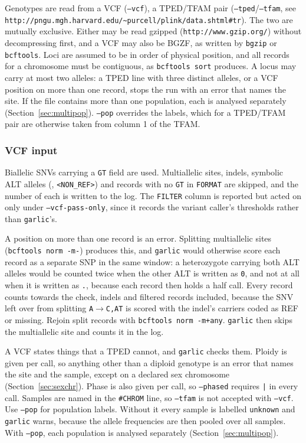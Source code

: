 \documentclass[12pt]{article}%
\begin{document}
Genotypes are read from a VCF ({\tt --vcf}), a TPED/TFAM pair ({\tt --tped}/{\tt --tfam}, see \\{\tt http://pngu.mgh.harvard.edu/\textasciitilde purcell/plink/data.shtml\#tr}).  The two are mutually exclusive.  Either may be read gzipped ({\tt http://www.gzip.org/}) without decompressing first, and a VCF may also be BGZF, as written by {\tt bgzip} or {\tt bcftools}.  Loci are assumed to be in order of physical position, and all records for a chromosome must be contiguous, as {\tt bcftools sort} produces.  A locus may carry at most two alleles: a TPED line with three distinct alleles, or a VCF position on more than one record, stops the run with an error that names the site.  If the file contains more than one population, each is analysed separately (Section~\ref{sec:multipop}).  {\tt --pop} overrides the labels, which for a TPED/TFAM pair are otherwise taken from column 1 of the TFAM.

\subsubsection{VCF input}
\label{sec:vcf}

Biallelic SNVs carrying a {\tt GT} field are used.  Multiallelic sites, indels, symbolic ALT alleles ({\tt *}, {\tt <NON\_REF>}) and records with no {\tt GT} in {\tt FORMAT} are skipped, and the number of each is written to the log.  The {\tt FILTER} column is reported but acted on only under {\tt --vcf-pass-only}, since it records the variant caller's thresholds rather than {\tt garlic}'s.

A position on more than one record is an error.  Splitting multiallelic sites ({\tt bcftools norm -m-}) produces this, and {\tt garlic} would otherwise score each record as a separate SNP in the same window: a heterozygote carrying both ALT alleles would be counted twice when the other ALT is written as {\tt 0}, and not at all when it is written as {\tt .}, because each record then holds a half call.  Every record counts towards the check, indels and filtered records included, because the SNV left over from splitting {\tt A}$\to${\tt C,AT} is scored with the indel's carriers coded as REF or missing.  Rejoin split records with {\tt bcftools norm -m+any}.  {\tt garlic} then skips the multiallelic site and counts it in the log.

A VCF states things that a TPED cannot, and {\tt garlic} checks them.  Ploidy is given per call, so anything other than a diploid genotype is an error that names the site and the sample, except on a declared sex chromosome (Section~\ref{sec:sexchr}).  Phase is also given per call, so {\tt --phased} requires {\tt |} in every call.  Samples are named in the {\tt \#CHROM} line, so {\tt --tfam} is not accepted with {\tt --vcf}.  Use {\tt --pop} for population labels.  Without it every sample is labelled {\tt unknown} and {\tt garlic} warns, because the allele frequencies are then pooled over all samples.  With {\tt --pop}, each population is analysed separately (Section~\ref{sec:multipop}).
\end{document}
